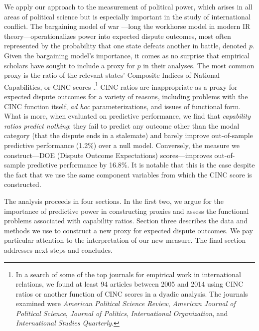 We apply our approach to the measurement of political power, which arises in all areas of political science but is especially important in the study of international conflict. 
The bargaining model of war \citep{fearon1995}---long the workhorse model in modern IR theory---operationalizes power into expected dispute outcomes, most often represented by the probability that one state defeats another in battle, denoted $p$. 
Given the bargaining model's importance, it comes as no surprise that empirical scholars have sought to include a proxy for $p$ in their analyses. 
The most common proxy is the ratio of the relevant states' Composite Indices of National Capabilities, or CINC scores \citep{singer1972}.\footnote{
  In a search of some of the top journals for empirical work in international relations, we found at least 94 articles between 2005 and 2014 using CINC ratios or another function of CINC scores in a dyadic analysis.
  The journals examined were \emph{American Political Science Review}, \emph{American Journal of Political Science}, \emph{Journal of Politics}, \emph{International Organization}, and \emph{International Studies Quarterly}.
}
CINC ratios are inappropriate as a proxy for expected dispute outcomes for a variety of reasons, including problems with the CINC function itself, \emph{ad hoc} parameterizations, and issues of functional form. 
What is more, when evaluated on predictive performance, we find that \emph{capability ratios predict nothing}: they fail to predict any outcome other than the modal category (that the dispute ends in a stalemate) and barely improve out-of-sample predictive performance (1.2\%) over a null model. 
Conversely, the measure we construct---DOE (Dispute Outcome Expectations) scores---improves out-of-sample predictive performance by 16.8\%. 
It is notable that this is the case despite the fact that we use the same component variables from which the CINC score is constructed.

The analysis proceeds in four sections. 
In the first two, we argue for the importance of predictive power in constructing proxies and assess the functional problems associated with capability ratios. 
Section three describes the data and methods we use to construct a new proxy for expected dispute outcomes.
We pay particular attention to the interpretation of our new measure. 
The final section addresses next steps and concludes. 

